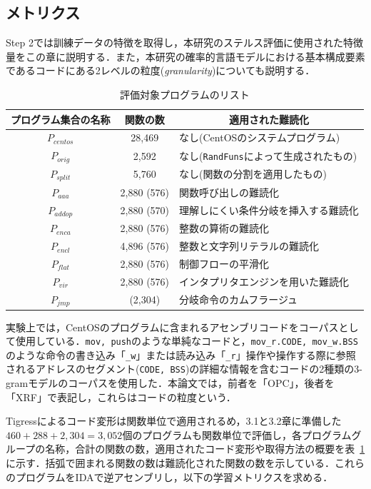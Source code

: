 \documentclass[12pt]{jarticle}
\newcommand\doubleRule{\toprule\toprule}
\begin{document}
\subsection{メトリクス} \label{sub:metrics}
Step 2では訓練データの特徴を取得し，本研究のステルス評価に使用された特徴量をこの章に説明する．また，本研究の確率的言語モデルにおける基本構成要素であるコードにある2レベルの粒度(\textit{granularity})についても説明する．

\begin{table}[!b]
\centering
\caption{評価対象プログラムのリスト}
\label{table:proglist}
\begin{tabular}[t]{c|c|l}
\doubleRule
\textbf{プログラム集合の名称} & \textbf{関数の数} & \multicolumn{1}{c}{\textbf{適用された難読化}}\\
\hline
$P_{centos}$ & 28,469 & なし(CentOSのシステムプログラム) \\
$P_{orig}$ & 2,592 & なし(\texttt{RandFuns}によって生成されたもの) \\
$P_{split}$ & 5,760 & なし(関数の分割を適用したもの) \\\hline
$P_{aaa}$ & 2,880 (576) & 関数呼び出しの難読化 \\
$P_{addop}$ & 2,880 (570) & 理解しにくい条件分岐を挿入する難読化 \\
$P_{enca}$ & 2,880 (576) & 整数の算術の難読化 \\
$P_{encl}$ & 4,896 (576) & 整数と文字列リテラルの難読化 \\
$P_{flat}$ & 2,880 (576) & 制御フローの平滑化 \\
$P_{vir}$ & 2,880 (576) & インタプリタエンジンを用いた難読化 \\
$P_{jmp}$ & (2,304) & 分岐命令のカムフラージュ \\
\bottomrule
\end{tabular}
\end{table}

実験上では，CentOSのプログラムに含まれるアセンブリコードをコーパスとして使用している．\texttt{mov, push}のような単純なコードと，\texttt{mov\_r.CODE, mov\_w.BSS}のような命令の書き込み「\texttt{\_w}」または読み込み「\texttt{\_r}」操作や操作する際に参照されるアドレスのセグメント(\texttt{CODE, BSS})の詳細な情報を含むコードの2種類の3-gramモデルのコーパスを使用した．本論文では，前者を「OPC」，後者を「XRF」で表記し，これらはコードの粒度という．

Tigressによるコード変形は関数単位で適用されるめ，3.1と3.2章に準備した$460+288+2,304=3,052$個のプログラムも関数単位で評価し，各プログラムグループの名称，合計の関数の数，適用されたコード変形や取得方法の概要を表~\ref{table:proglist}に示す．括弧で囲まれる関数の数は難読化された関数の数を示している．これらのプログラムをIDAで逆アセンブリし，以下の学習メトリクスを求める．
\end{document}
